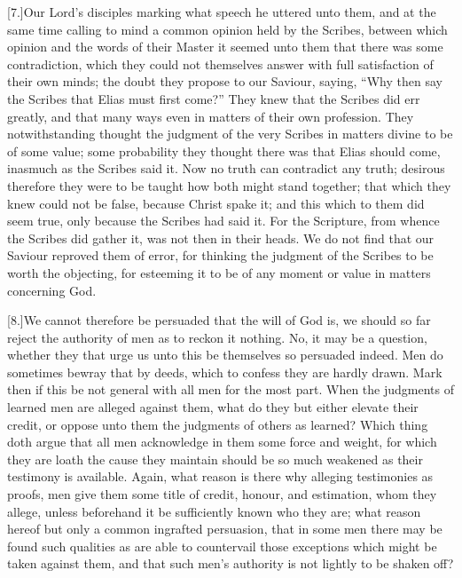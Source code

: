 [7.]Our Lord’s disciples marking what speech he uttered unto them, and at the same time calling to mind a common opinion held by the Scribes, between which opinion and the words of their Master it seemed unto them that there was some contradiction, which they could not themselves answer with full satisfaction of their own minds; the doubt they propose to our Saviour, saying, “Why then say the Scribes that Elias must first come?” They knew that the Scribes did err greatly, and that many ways even in matters of their own profession. They notwithstanding thought the judgment of the very Scribes in matters divine to be of some value; some probability they thought there was that Elias should come, inasmuch as the Scribes said it. Now no truth can contradict any truth; desirous therefore they were to be taught how both might stand together; that which they knew could not be false, because Christ spake it; and this which to them did seem true, only because the Scribes had said it. For the Scripture, from whence the Scribes did gather it, was not then in their heads. We do not find that our Saviour reproved them of error, for thinking the judgment of the Scribes to be worth the objecting, for esteeming it to be of any moment or value in matters concerning God.


[8.]We cannot therefore be persuaded that the will of God is, we should so far reject the authority of men as to reckon it nothing. No, it may be a question, whether they that urge us unto this be themselves so persuaded indeed. Men do sometimes bewray that by deeds, which to confess they are hardly drawn. Mark then if this be not general with all men for the most part. When the judgments of learned men are alleged against them, what do they but either elevate their credit, or oppose unto them the judgments of others as learned? Which thing doth argue that all men acknowledge in them some force and weight, for which they are loath the cause they maintain should be so much weakened as their testimony is available. Again, what reason is there why alleging testimonies as proofs, men give them some title of credit, honour, and estimation, whom they allege, unless beforehand it be sufficiently known who they are; what reason hereof but only a common ingrafted persuasion, that in some men there may be found such qualities as are able to countervail those exceptions which might be taken against them, and that such men’s authority is not lightly to be shaken off?

